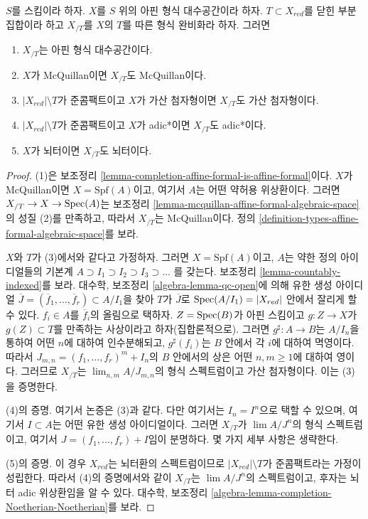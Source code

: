 \begin{lemma}
\label{lemma-recompletion-affine-types}
$S$를 스킴이라 하자. $X$를 $S$ 위의 아핀 형식 대수공간이라 하자.
$T \subset X_{red}$를 닫힌 부분집합이라 하고 $X_{/T}$를
$X$의 $T$를 따른 형식 완비화라 하자. 그러면
\begin{enumerate}
\item $X_{/T}$는 아핀 형식 대수공간이다.
\item $X$가 McQuillan이면 $X_{/T}$도 McQuillan이다.
\item $|X_{red}| \setminus T$가 준콤팩트이고 $X$가 가산 첨자형이면
$X_{/T}$도 가산 첨자형이다.
\item $|X_{red}| \setminus T$가 준콤팩트이고 $X$가 adic*이면
$X_{/T}$도 adic*이다.
\item $X$가 뇌터이면 $X_{/T}$도 뇌터이다.
\end{enumerate}
\end{lemma}

\begin{proof}
(1)은 보조정리 \ref{lemma-completion-affine-formal-is-affine-formal}이다.
$X$가 McQuillan이면 $X = \text{Spf}(A)$이고, 여기서 $A$는 어떤
약허용 위상환이다. 그러면
$X_{/T} \to X \to \mathop{\mathrm{Spec}}(A)$는 보조정리
\ref{lemma-mcquillan-affine-formal-algebraic-space}의 성질 (2)를
만족하고, 따라서 $X_{/T}$는 McQuillan이다. 정의
\ref{definition-types-affine-formal-algebraic-space}를 보라.

\medskip\noindent
$X$와 $T$가 (3)에서와 같다고 가정하자.
그러면 $X = \text{Spf}(A)$이고, $A$는 약한 정의 아이디얼들의
기본계
$A \supset I_1 \supset I_2 \supset I_3 \supset \ldots$
를 갖는다. 보조정리 \ref{lemma-countably-indexed}를 보라.
대수학, 보조정리 \ref{algebra-lemma-qc-open}에 의해 유한 생성 아이디얼
$\overline{J} = (\overline{f}_1, \ldots, \overline{f}_r) \subset A/I_1$을
찾아 $T$가 $\overline{J}$로 $\mathop{\mathrm{Spec}}(A/I_1) = |X_{red}|$ 안에서
잘리게 할 수 있다.
$f_i \in A$를 $\overline{f}_i$의 올림으로 택하자.
$Z = \mathop{\mathrm{Spec}}(B)$가 아핀 스킴이고 $g : Z \to X$가
$g(Z) \subset T$를 만족하는 사상이라고 하자(집합론적으로).
그러면 $g^\sharp : A \to B$는 $A/I_n$을 통하여 어떤 $n$에 대하여
인수분해되고, $g^\sharp(f_i)$는 $B$ 안에서 각 $i$에 대하여
멱영이다. 따라서
$J_{m, n} = (f_1, \ldots, f_r)^m + I_n$의 $B$ 안에서의 상은 어떤
$n, m \geq 1$에 대하여 영이다.
그러므로 $X_{/T}$는 $\lim_{n, m} A/J_{m, n}$의 형식 스펙트럼이고
가산 첨자형이다. 이는 (3)을 증명한다.

\medskip\noindent
(4)의 증명. 여기서 논증은 (3)과 같다.
다만 여기서는 $I_n = I^n$으로 택할 수 있으며, 여기서 $I \subset A$는
어떤 유한 생성 아이디얼이다. 그러면 $X_{/T}$가
$\lim A/J^n$의 형식 스펙트럼이고, 여기서
$J = (f_1, \ldots, f_r) + I$임이 분명하다. 몇 가지 세부 사항은 생략한다.

\medskip\noindent
(5)의 증명. 이 경우 $X_{red}$는 뇌터환의 스펙트럼이므로
$|X_{red}| \setminus T$가 준콤팩트라는 가정이 성립한다.
따라서 (4)의 증명에서와 같이
$X_{/T}$는 $\lim A/J^n$의 스펙트럼이고, 후자는 뇌터 adic
위상환임을 알 수 있다. 대수학, 보조정리
\ref{algebra-lemma-completion-Noetherian-Noetherian}를 보라.
\end{proof}

